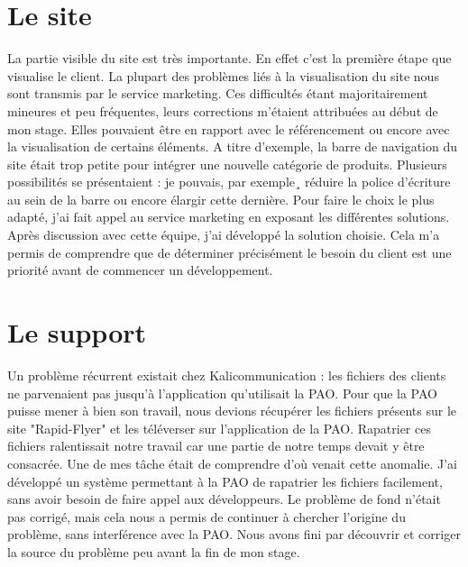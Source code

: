 
\section{Le site}
La partie visible du site est très importante. En effet c'est la première étape que visualise le client. La plupart des problèmes liés à la visualisation du site nous sont transmis par le service marketing. Ces difficultés étant majoritairement mineures et peu fréquentes, leurs corrections m'étaient attribuées au début de mon stage. Elles pouvaient être en rapport avec le référencement ou encore avec la visualisation de certains éléments.\newline
A titre d'exemple, la barre de navigation du site était trop petite pour intégrer une nouvelle catégorie de produits. Plusieurs possibilités se présentaient : je pouvais, par exemple¸ réduire la police d'écriture au sein de la barre ou encore élargir cette dernière. Pour faire le choix le plus adapté, j'ai fait appel au service marketing en exposant les différentes solutions. Après discussion avec cette équipe, j'ai développé la solution choisie.\newline
Cela m'a permis de comprendre que de déterminer précisément le besoin du client est une priorité avant de commencer un développement.

\section{Le support}
Un problème récurrent existait chez Kalicommunication : les fichiers des clients ne parvenaient pas jusqu'à l'application qu'utilisait la PAO. Pour que la PAO puisse mener à bien son travail, nous devions récupérer les fichiers présents sur le site "Rapid-Flyer" et les téléverser sur l'application de la PAO.\newline
Rapatrier ces fichiers ralentissait notre travail car une partie de notre temps devait y être consacrée.\newline
Une de mes tâche était de comprendre d'où venait cette anomalie. J'ai développé un système permettant à la PAO de rapatrier les fichiers facilement, sans avoir besoin de faire appel aux développeurs. Le problème de fond n'était pas corrigé, mais cela nous a permis de continuer à chercher l'origine du problème, sans interférence avec la PAO.\newline
Nous avons fini par découvrir et corriger la source du problème peu avant la fin de mon stage.

